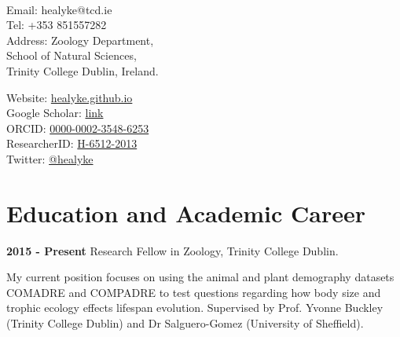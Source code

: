 \documentclass[10pt,a4paper]{article}
\begin{document}
\par{\smallskip\par}

\large{}\\
\smallskip

\par{\normalsize{}\bigskip\par}


\begin{minipage}[t]{0.5\textwidth}
\raggedright

Email:  healyke@tcd.ie\\
Tel: \hspace{0mm}+353 851557282\\
Address: Zoology Department,\\
\hspace{0mm}School of Natural Sciences,\\
\hspace{0mm}Trinity College Dublin, Ireland.\\ 


\end{minipage}
\begin{minipage}[t]{0.45\textwidth}

Website: \href{http://healyke.github.io}{healyke.github.io}\\
Google Scholar: \href{http://scholar.google.com/citations?user=5Kb9u8EAAAAJ}{link}\\
ORCID: \href{http://orcid.org/0000-0002-3548-6253}{0000-0002-3548-6253}\\
ResearcherID: \href{http://www.researcherid.com/rid/H-6512-2013}{H-6512-2013}\\
Twitter: \href{https://twitter.com/healyke}{@healyke}\\
\end{minipage}

\bigskip

\section{Education and Academic Career}
\raggedright	
\textbf{2015 - Present} Research Fellow in Zoology, Trinity College Dublin.
 \smallskip
\par{\fontsize{10.5}{10} My current position focuses on using the animal and plant demography datasets COMADRE and COMPADRE to test questions regarding how body size and trophic ecology effects lifespan evolution. Supervised by Prof. Yvonne Buckley (Trinity College Dublin) and Dr Salguero-Gomez (University of Sheffield).\bigskip}
\end{document}
